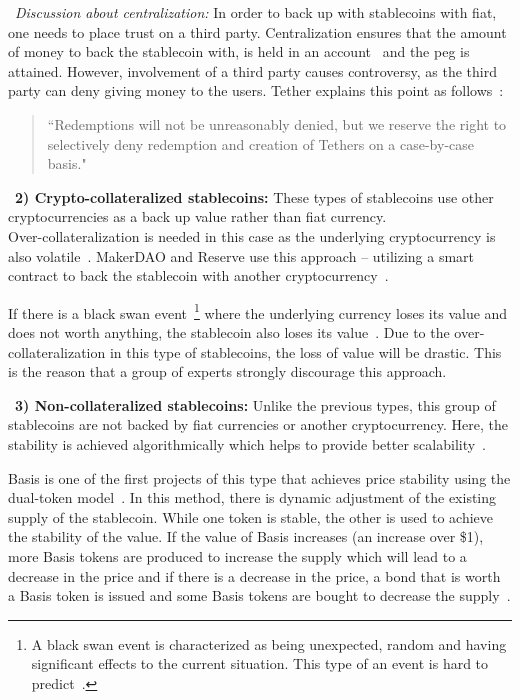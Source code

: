 ~\textit{Discussion about centralization:} In order to back up with stablecoins with fiat, one needs to place trust on a third party. Centralization ensures that the amount of money to back the stablecoin with, is held in an account~\cite{techrev} and the peg is attained. However, involvement of a third party causes controversy, as the third party can deny giving money to the users. Tether explains this point as follows~\cite{cryptoinsider}:

\begin{quote}
``Redemptions will not be unreasonably denied, but we reserve the right to selectively deny redemption and creation of Tethers on a case-by-case basis."
\end{quote}


~\textbf{2) Crypto-collateralized stablecoins:} These types of stablecoins use other cryptocurrencies as a back up value rather than fiat currency. \\ Over-collateralization is needed in this case as the underlying cryptocurrency is also volatile~\cite{linkedin}. MakerDAO and Reserve use this approach -- utilizing a smart contract to back the stablecoin with another cryptocurrency~\cite{cointelegraph}.

If there is a black swan event~\footnote{A black swan event is characterized as being unexpected, random and having significant effects to the current situation. This type of an event is hard to predict~\cite{swan}.} where the underlying currency loses its value and does not worth anything, the stablecoin also loses its value~\cite{coinsexplained}.  Due to the over-collateralization in this type of stablecoins, the loss of value will be drastic. This is the reason that a group of experts strongly discourage this approach.

~\textbf{3) Non-collateralized stablecoins:} Unlike the previous types, this group of stablecoins are not backed by fiat currencies or another cryptocurrency. Here, the stability is achieved algorithmically which helps to provide better scalability~\cite{report}.

Basis is one of the first projects of this type that achieves price stability using the dual-token model~\cite{cryptoinsider}. In this method, there is dynamic adjustment of the existing supply of the stablecoin. While one token is stable, the other is used to achieve the stability of the value. If the value of Basis increases (an increase over \$1), more Basis tokens are produced to increase the supply which will lead to a decrease in the price and if there is a decrease in the price, a bond that is worth a Basis token is issued and some Basis tokens are bought to decrease the supply~\cite{euromoney}.


